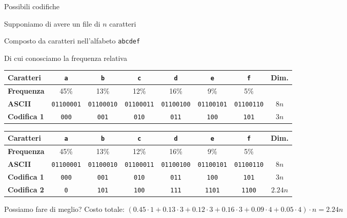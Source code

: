 \begin{frame}{Possibili codifiche}

\vspace{-9pt}
\begin{myboxtitle}[Esempio]
\BI
\item Supponiamo di avere un file di $n$ caratteri
\item Composto da caratteri nell'alfabeto \texttt{abcdef}
\item Di cui conosciamo la frequenza relativa
\EI
\end{myboxtitle}

\bigskip
\begin{overprint}
\begin{tabular}{|l|c|c|c|c|c|c|c|}
\hline
\textbf{Caratteri} & \texttt{a} & \texttt{b} & \texttt{c} & \texttt{d} & \texttt{e} & \texttt{f} & \textbf{Dim.} \\\hline
\textbf{Frequenza} & 45\% & 13\% & 12\% & 16\% & 9\% & 5\% & \\ \hline
\textbf{ASCII} & \texttt{\tiny 01100001} & \texttt{\tiny 01100010} & \texttt{\tiny 01100011} & \texttt{\tiny 01100100} & \texttt{\tiny 01100101} & \texttt{\tiny 01100110} & $8n$ \\\hline
\textbf{Codifica 1} & \texttt{\small 000} & \texttt{\small 001} & \texttt{\small 010} & \texttt{\small 011} & \texttt{\small 100} & \texttt{\small 101} & $3n$ \\\hline
\end{tabular}
\begin{tabular}{|l|c|c|c|c|c|c|c|}
\hline
\textbf{Caratteri} & \texttt{a} & \texttt{b} & \texttt{c} & \texttt{d} & \texttt{e} & \texttt{f} & \textbf{Dim.} \\\hline
\textbf{Frequenza} & 45\% & 13\% & 12\% & 16\% & 9\% & 5\% & \\ \hline
\textbf{ASCII} & \texttt{\tiny 01100001} & \texttt{\tiny 01100010} & \texttt{\tiny 01100011} & \texttt{\tiny 01100100} & \texttt{\tiny 01100101} & \texttt{\tiny 01100110} & $8n$ \\\hline
\textbf{Codifica 1} & \texttt{\small 000} & \texttt{\small 001} & \texttt{\small 010} & \texttt{\small 011} & \texttt{\small 100} & \texttt{\small 101} & $3n$ \\\hline
\textbf{Codifica 2} & \texttt{\small 0} & \texttt{\small 101} & \texttt{\small 100} & \texttt{\small 111} & \texttt{\small 1101} & \texttt{\small 1100} & $2.24n$ \\\hline
\end{tabular}
\end{overprint}
\bigskip
\begin{overprint}
\alert{Possiamo fare di meglio?}
\alert{Costo totale}: $(0.45 \cdot 1+0.13 \cdot 3+0.12 \cdot 3+0.16 \cdot 3+0.09 \cdot 4+0.05 \cdot 4) \cdot n=2.24n$
\end{overprint}
\end{frame}


